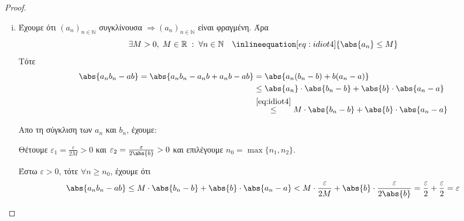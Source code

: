 \documentclass[main.tex]{subfiles}
\begin{document}
\begin{proof}
\begin{enumerate}[i)]
    \item Έχουμε ότι $ (a_{n})_{n \in \mathbb{N}} $ συγκλίνουσα $ 
      \Rightarrow (a_{n})_{n \in \mathbb{N}} $ είναι φραγμένη. 
      Άρα 
      \[ 
        \exists M >0, \; M \in \mathbb{R} \; : \; \forall n \in 
        \mathbb{N} \quad \inlineequation[eq:idiot4]{\abs{a_{n}} 
        \leq M}
      \] 
      Τότε 
      \begin{align*}
        \abs{a_{n} b_{n} - ab} = \abs{a_{n}b_{n} - a_{n}b + 
        a_{n}b -ab} &= \abs{a_{n}(b_{n}-b)+b(a_{n}-a) } \\
                    &\leq \abs{a_{n}}\cdot \abs{b_{n}-b} + \abs{b} 
                    \cdot \abs{a_{n}-a} \\
                    &\overset{\eqref{eq:idiot4}}{\leq} 
                    M \cdot  \abs{b_{n}-b} + \abs {b}\cdot 
                    \abs{a_{n}-a}
      \end{align*}

      Απο τη σύγκλιση των $ a_{n} $ και $ b_{n} $, έχουμε:

      Θέτουμε $ \varepsilon_{1} = \frac{\varepsilon}{2M} >0 $ 
      και $ \varepsilon_{2} = \frac{\varepsilon}{2\abs{b}} >0 $ 
      και επιλέγουμε $ n_{0}= \max \{ n_{1}, n_{2}\} $.

      Έστω $ \varepsilon >0 $, τότε $ \forall n \geq n_{0}$, 
      έχουμε ότι 
      \[
        \abs{a_{n} b_{n} - ab} \leq M \cdot \abs{b_{n}-b} + 
        \abs{b} \cdot \abs{a_{n}- a} < M \cdot 
        \frac{\varepsilon}{2 M} + \abs {b} \cdot 
        \frac{\varepsilon}{2 \abs{b}} =
        \frac{\varepsilon}{2} + \frac{\varepsilon}{2} = 
        \varepsilon
      \]

\end{enumerate}
\end{proof}
\end{document}
